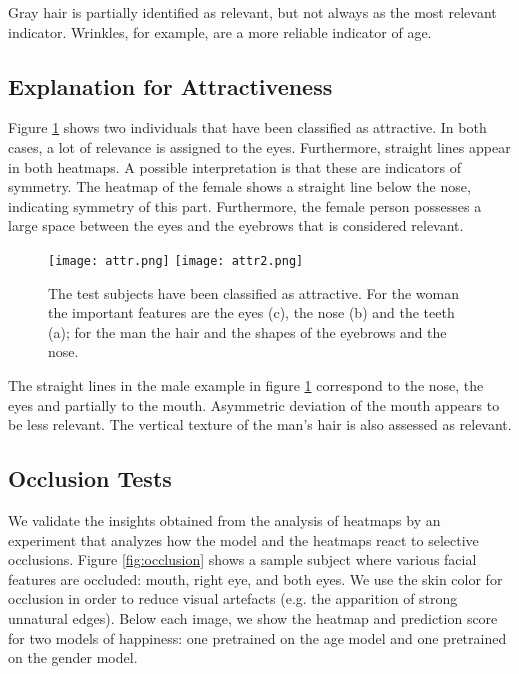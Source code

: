 \documentclass[runningheads]{llncs}
\begin{document}
Gray hair is partially identified as relevant, but not always as the most relevant indicator. Wrinkles, for example, are a more reliable indicator of age.

\subsection{Explanation for Attractiveness}
Figure \ref{fig:attr} shows two individuals that have been classified as attractive. In both cases, a lot of relevance is assigned to the eyes. Furthermore, straight lines appear in both heatmaps. A possible interpretation is that these are indicators of symmetry. The heatmap of the female shows a straight line below the nose, indicating symmetry of this part. Furthermore, the female person possesses a large space between the eyes and the eyebrows that is considered relevant.
\begin{figure}[t]
\centering
\texttt{[image: attr.png]}
\texttt{[image: attr2.png]}
\caption{
The test subjects have been classified as attractive. For the woman the important features are the eyes (c), the nose (b) and the teeth (a); for the man the hair and the shapes of the eyebrows and the nose.
}
\label{fig:attr}
\end{figure}

The straight lines in the male example in figure \ref{fig:attr} correspond to the nose, the eyes and partially to the mouth. Asymmetric deviation of the mouth appears to be less relevant. The vertical texture of the man's hair is also assessed as relevant.

\subsection{Occlusion Tests}

We validate the insights obtained from the analysis of heatmaps by an experiment that analyzes how the model and the heatmaps react to selective occlusions. Figure \ref{fig:occlusion} shows a sample subject where various facial features are occluded: mouth, right eye, and both eyes. We use the skin color for occlusion in order to reduce visual artefacts (e.g. the apparition of strong unnatural edges). Below each image, we show the heatmap and prediction score for two models of happiness: one pretrained on the age model and one pretrained on the gender model.

\end{document}

